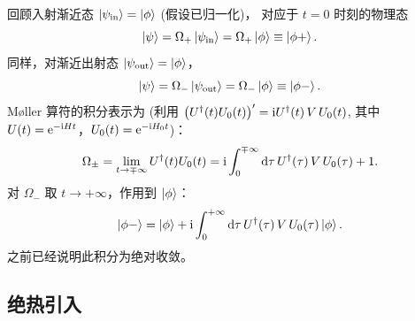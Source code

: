 回顾入射渐近态 $\ket{\psi_{\rm in}}=\ket{\phi}$ (假设已归一化)，
对应于 $t=0$ 时刻的物理态
\begin{equation}
  \ket{\psi} = \Omega_+\ket{\psi_{\rm in}} = \Omega_+\ket\phi
  \equiv \ket{\phi+}.
\end{equation}
同样，对渐近出射态 $\ket{\psi_{\rm out}}=\ket\phi$，
\begin{equation}
  \ket{\psi} = \Omega_-\ket{\psi_{\rm out}} = \Omega_-\ket\phi
  \equiv \ket{\phi-}.
\end{equation}
M\o ller 算符的积分表示为 (利用
$\bigl(U^\dagger(t)U_0(t)\bigr)' = \mathrm{i} U^\dagger(t)\,V\,U_0(t)$,
其中 $U(t)=\mathrm{e}^{-\mathrm{i} Ht}$，$U_0(t)=\mathrm{e}^{-\mathrm{i} H_0 t}$)：
\begin{equation}\label{eq:Omega-integral}
  \Omega_\pm = \lim_{t\to\mp\infty} U^\dagger(t)U_0(t)
  = \mathrm{i}\int_0^{\mp\infty}\mathrm{d}\tau\, U^\dagger(\tau)\,V\,U_0(\tau) + 1.
\end{equation}
对 $\Omega_-$ 取 $t\to+\infty$，作用到 $\ket\phi$：
\begin{equation}\label{eq:phi-minus-integral}
  \ket{\phi-} = \ket\phi + \mathrm{i}\int_0^{+\infty}\mathrm{d}\tau\,
                    U^\dagger(\tau)\,V\,U_0(\tau)\ket\phi.
\end{equation}
之前已经说明此积分为绝对收敛。

\subsection{绝热引入}

